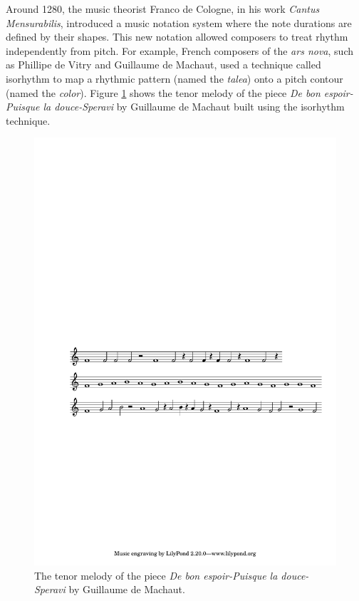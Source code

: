 Around 1280, the music theorist Franco de Cologne, in his work \textit{Cantus Mensurabilis}, introduced a music notation system where the note durations are defined by their shapes. This new notation allowed composers to treat rhythm independently from pitch. For example, French composers of the \textit{ars nova}, such as Phillipe de Vitry and Guillaume de Machaut, used a technique called isorhythm to map a rhythmic pattern (named the \textit{talea}) onto a pitch contour (named the \textit{color}). Figure \ref{fig:isorhythm} shows the tenor melody of the piece \textit{De bon espoir-Puisque la douce-Speravi} by Guillaume de Machaut built using the isorhythm technique.

\begin{figure}[!h]
 \centering
 \includegraphics[width=\columnwidth]{imgs/background/isorhythm.pdf}
 \caption{The tenor melody of the piece \textit{De bon espoir-Puisque la douce-Speravi} by Guillaume de Machaut.}
 \label{fig:isorhythm}
\end{figure}

